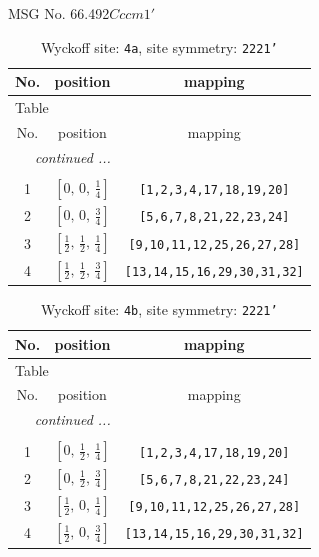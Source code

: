 \documentclass[fleqn,8pt]{jsarticle}
\begin{document}
\setcounter{MaxMatrixCols}{32}

\renewcommand{\tablename}{Table~}
\renewcommand{\figurename}{Figure~}
\begin{center}
\LARGE
MSG No. 66.492\quad$Cccm1'$
\end{center}
\renewcommand{\arraystretch}{1.2}
\begin{longtable}{ccc}
\caption{Wyckoff site: {\tt 4a}, site symmetry: {\tt 2221'}}
 \\
 \hline \hline
No. & position & mapping \\ \hline \endfirsthead

\multicolumn{2}{l}{\tablename\ \thetable{}} \\
 \hline \hline
No. & position & mapping \\ \hline \endhead

 \hline \hline
\multicolumn{2}{r}{\footnotesize\it continued ...} \\ \endfoot

 \hline \hline
\multicolumn{2}{r}{} \\ \endlastfoot

1 & $\left[ 0,\, 0,\, \frac{1}{4} \right]$ & {\tt [1,2,3,4,17,18,19,20]} \\ \hline
2 & $\left[ 0,\, 0,\, \frac{3}{4} \right]$ & {\tt [5,6,7,8,21,22,23,24]} \\ \hline
3 & $\left[ \frac{1}{2},\, \frac{1}{2},\, \frac{1}{4} \right]$ & {\tt [9,10,11,12,25,26,27,28]} \\ \hline
4 & $\left[ \frac{1}{2},\, \frac{1}{2},\, \frac{3}{4} \right]$ & {\tt [13,14,15,16,29,30,31,32]} \\
\end{longtable}
\renewcommand{\arraystretch}{1.2}
\begin{longtable}{ccc}
\caption{Wyckoff site: {\tt 4b}, site symmetry: {\tt 2221'}}
 \\
 \hline \hline
No. & position & mapping \\ \hline \endfirsthead

\multicolumn{2}{l}{\tablename\ \thetable{}} \\
 \hline \hline
No. & position & mapping \\ \hline \endhead

 \hline \hline
\multicolumn{2}{r}{\footnotesize\it continued ...} \\ \endfoot

 \hline \hline
\multicolumn{2}{r}{} \\ \endlastfoot

1 & $\left[ 0,\, \frac{1}{2},\, \frac{1}{4} \right]$ & {\tt [1,2,3,4,17,18,19,20]} \\ \hline
2 & $\left[ 0,\, \frac{1}{2},\, \frac{3}{4} \right]$ & {\tt [5,6,7,8,21,22,23,24]} \\ \hline
3 & $\left[ \frac{1}{2},\, 0,\, \frac{1}{4} \right]$ & {\tt [9,10,11,12,25,26,27,28]} \\ \hline
4 & $\left[ \frac{1}{2},\, 0,\, \frac{3}{4} \right]$ & {\tt [13,14,15,16,29,30,31,32]} \\
\end{longtable}
\end{document}

